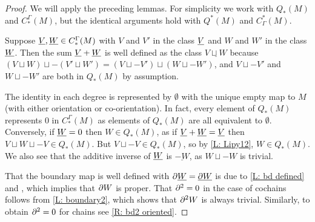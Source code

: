 \begin{proof}
	We will apply the preceding lemmas.
	For simplicity we work with $Q_*(M)$ and $C^\Gamma_*(M)$, but the identical arguments hold with $Q^*(M)$ and $C_\Gamma^*(M)$.

	Suppose $\underline{V},\underline{W} \in C^\Gamma_*(M)$ with $V$ and $V'$ in the class $\underline{V}$ and $W$ and $W'$ in the class $\underline{W}$.
	Then the sum $\underline{V}+\underline{W}$ is well defined as the class $\underline{V \sqcup W}$ because $(V \sqcup W) \sqcup -(V' \sqcup W') = (V \sqcup -V') \sqcup (W \sqcup -W')$, and $V \sqcup -V'$ and $W \sqcup -W'$ are both in $Q_*(M)$ by assumption.

	The identity in each degree is represented by $\emptyset$ with the unique empty map to $M$ (with either orientation or co-orientation).
	In fact, every element of $Q_*(M)$ represents $0$ in $C^\Gamma_*(M)$ as elements of $Q_*(M)$ are all equivalent to $\emptyset$.
	Conversely, if $\underline{W} = 0$ then $W \in Q_*(M)$, as if $\underline{V}+\underline{W} = \underline{V}$ then $V \sqcup W \sqcup -V \in Q_*(M)$.
	But $V \sqcup -V \in Q_*(M)$, so by \cref{L: Lipy12}, $W \in Q_*(M)$.
	We also see that the additive inverse of $\underline{W}$ is $\underline{-W}$, as $W \sqcup -W$ is trivial.

	That the boundary map is well defined with $\partial \underline{W} = \underline{\partial W}$ is due to \cref{L: bd defined} and \cite[Lemma 2.8]{Joy12}, which implies that $\partial W$ is proper.
	That $\partial^2 = 0$ in the case of cochains follows from \cref{L: boundary2}, which shows that $\partial^2 W$ is always trivial.
	Similarly, to obtain $\partial^2 = 0$ for chains see \cref{R: bd2 oriented}.
\end{proof}

\begin{comment}
	Thom deeply considered the interplay between manifolds
	and homology \cite{Thom54}, and the cohomology classes we produce for submanifolds are equal to the pullbacks of Thom classes by Thom collapse maps.
	Similar objects were defined by Quillen \cite{Quil71} as an immediate translation of the data which encodes cobordism generalized cohomology theories.
	Thus, we name the QT-objects which represent equivalence classes of geometric cochains, defined below, in honor of Quillen and Thom.
\end{comment}

\begin{comment}
	If $i \colon W \to M$ is an embedding of a submanifold,
	we abuse notation by referring to the cochain as $\tau_W$, suppressing the reference map from the notation.
	Indeed, the image of any $\tau_i$ under our comparison map to cubical cochains will be the same.
\end{comment}

